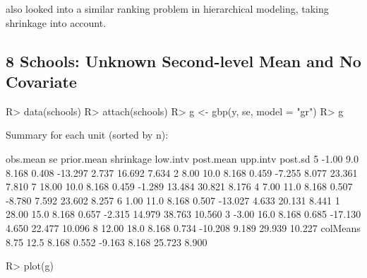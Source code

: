 \documentclass[article]{jss}
\begin{document}


\cite{1995} also looked into a similar ranking problem in hierarchical modeling, taking shrinkage into account.


\subsection[Unknown Second-level Mean and No Covariate]{8 Schools: Unknown Second-level Mean and No Covariate}
\begin{CodeChunk}
\begin{CodeInput}
R> data(schools)
R> attach(schools)
R> g <- gbp(y, se, model = "gr")
R> g
\end{CodeInput}
\begin{CodeOutput}
Summary for each unit (sorted by n):

         obs.mean   se prior.mean shrinkage low.intv post.mean upp.intv post.sd
5           -1.00  9.0      8.168     0.408  -13.297     2.737   16.692   7.634
2            8.00 10.0      8.168     0.459   -7.255     8.077   23.361   7.810
7           18.00 10.0      8.168     0.459   -1.289    13.484   30.821   8.176
4            7.00 11.0      8.168     0.507   -8.780     7.592   23.602   8.257
6            1.00 11.0      8.168     0.507  -13.027     4.633   20.131   8.441
1           28.00 15.0      8.168     0.657   -2.315    14.979   38.763  10.560
3           -3.00 16.0      8.168     0.685  -17.130     4.650   22.477  10.096
8           12.00 18.0      8.168     0.734  -10.208     9.189   29.939  10.227
colMeans     8.75 12.5      8.168     0.552   -9.163     8.168   25.723   8.900
\end{CodeOutput}
\end{CodeChunk}


\begin{CodeChunk}
\begin{CodeInput}
R> plot(g)
\end{CodeInput}
\end{CodeChunk}
\end{document}
